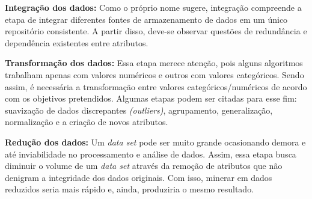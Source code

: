 \documentclass[tg]{mdtufsm}
\begin{document}
\textbf{Integração dos dados:} Como o próprio nome sugere, integração compreende a etapa de integrar diferentes fontes de armazenamento de dados em um único repositório consistente. A partir disso, deve-se observar questões de redundância e dependência existentes entre atributos.

\textbf{Transformação dos dados:} Essa etapa merece atenção, pois alguns algoritmos trabalham apenas com valores numéricos e outros com valores categóricos. Sendo assim, é necessária a transformação entre valores categóricos/numéricos de acordo com os objetivos pretendidos. Algumas etapas podem ser citadas para esse fim: suavização de dados discrepantes \textit{(outliers)}, agrupamento, generalização, normalização e a criação de novos atributos.

\textbf{Redução dos dados:} Um \textit{data set} pode ser muito grande ocasionando demora e até inviabilidade no processamento e análise de dados. Assim, essa etapa busca diminuir o volume de um \textit{data set} através da remoção de atributos que não denigram a integridade dos dados originais. Com isso, minerar em dados reduzidos seria mais rápido e, ainda, produziria o mesmo resultado. 


 
\setlength{\baselineskip}{\baselineskip}



\end{document}

